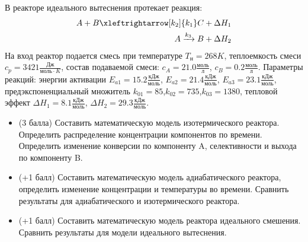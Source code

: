  В реакторе идеального вытеснения протекает реакция: \begin{equation*} \begin{aligned} A+B \xleftrightarrow[k_2]{k_1} C +\Delta H_1 \\ A \xrightarrow{k_3} B + \Delta H_2 \end{aligned} \end{equation*}                                     На вход  реактор подается смесь при температуре $ T_н =  268 K$, теплоемкость смеси $c_p= 3421 \frac{Дж}{моль \cdot K}$, состав подаваемой смеси: $c_A=21.0 \frac{моль}{л}$, $c_B=0.2 \frac{моль}{л}$. Параметры реакций: энергии активации $E_{a1}=15.2 \frac{кДж}{моль}$, $E_{a2}=21.4  \frac{кДж}{моль}$, $E_{a3}=23.1  \frac{кДж}{моль}$, предэкспоненциальный множитель $k_{01}=        85$,$k_{02}=       735$,$k_{03}=      1380$, тепловой эффект $\Delta H_1=  8.1  \frac{кДж}{моль}$, $\Delta H_2=29.3 \frac{кДж}{моль}$.\begin{itemize} \item (3 балла) Составить математическую модель изотермического реактора. Определить распределение концентрации компонентов по времени. Определить изменение конверсии по компоненту A, селективности и выхода по компоненту B. \item (+1 балл) Составить математическую модель адиабатического реактора, определить изменение концентрации и температуры во времени. Сравнить результаты для адиабатического и изотермического реактора. \item (+1 балл) Составить математическую модель реактора идеального смешения. Сравнить результаты для модели идеального вытеснения. \end{itemize}

